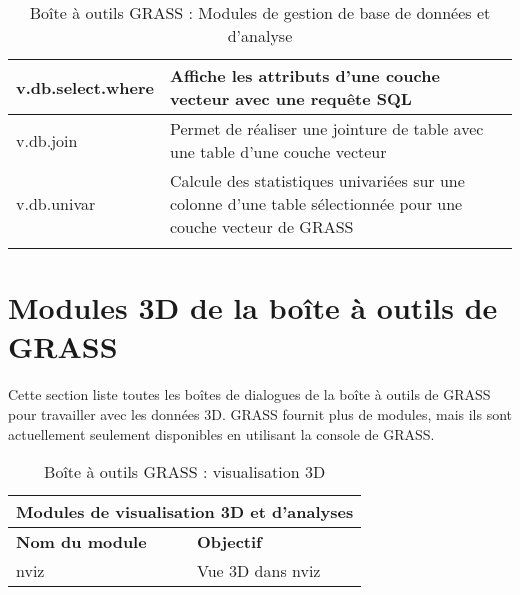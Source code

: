 \begin{center}
{\begin{longtable}{|p{4cm}|p{10cm}|}
  \hline v.db.select.where & Affiche les attributs d'une couche vecteur avec une requ\^ete SQL\\
  \hline v.db.join & Permet de réaliser une jointure de table avec une table d'une couche vecteur\\
  \hline v.db.univar & Calcule des statistiques univariées sur une colonne d'une table sélectionnée pour une couche vecteur de GRASS\\
\hline
\caption{Boîte à outils GRASS : Modules de gestion de base de données et d'analyse}
\end{longtable}}
\end{center} 

\newpage

\section{Modules 3D de la boîte à outils de GRASS}

Cette section liste toutes les boîtes de dialogues de la boîte à outils de GRASS pour travailler avec les données 3D. GRASS fournit plus de modules, mais ils sont actuellement seulement disponibles en utilisant la console de GRASS.

\begin{table}[H]
\centering
 \begin{tabular}{|p{4cm}|p{10cm}|}
  \hline \multicolumn{2}{|c|}{\textbf{Modules de visualisation 3D et d'analyses}}\\
  \hline \textbf{Nom du module} & \textbf{Objectif} \\
  \hline nviz & Vue 3D dans nviz\\
\hline
\end{tabular}
\caption{Boîte à outils GRASS : visualisation 3D}
\end{table}


